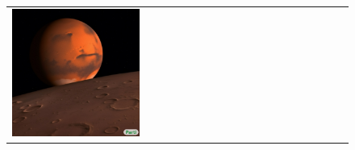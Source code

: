 \begin{figure}[ht!]
\begin{adjustwidth}{-0.8in}{-0.5in}
\begin{tabular}{cccccccccccccccccccc}
\multicolumn{2}{c}{\includegraphics[width=\threebythreecolwidth\textwidth]{figures/cherries/mars3.jpg}} \\


\end{tabular}
\end{adjustwidth}
\end{figure}

